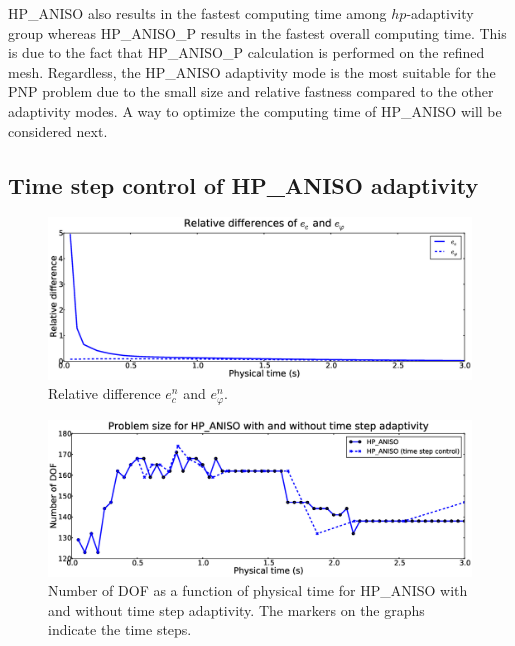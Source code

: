 HP\_ANISO also results in the fastest
computing time among $hp$-adaptivity group whereas HP\_ANISO\_P
results in the fastest overall computing time. This is due to the fact
that HP\_ANISO\_P calculation is performed on the refined mesh. 
Regardless, the HP\_ANISO adaptivity mode is the most suitable
for the PNP problem due to the small size and relative fastness compared
to the other adaptivity modes. A way to optimize the computing time
of HP\_ANISO will be considered next.

\subsection{Time step control of HP\_ANISO adaptivity}

\begin{figure}[!ht]
  \begin{centering}
  \includegraphics[width=\columnwidth]{cphi_relerr}
  \caption{\label{fig:cphirelerr} Relative difference $e_{c}^n$ and $e_{\varphi}^n$.}
  \end{centering}
\end{figure}
\begin{figure}[!ht]
  \begin{centering}
  \includegraphics[width=\columnwidth]{timeadapt_dof}
  \caption{\label{fig:timeadapt_dof} Number of DOF
  as a function of physical time for HP\_ANISO with and without
  time step adaptivity. The markers on the graphs indicate the
  time steps.}
  \end{centering}
\end{figure}
